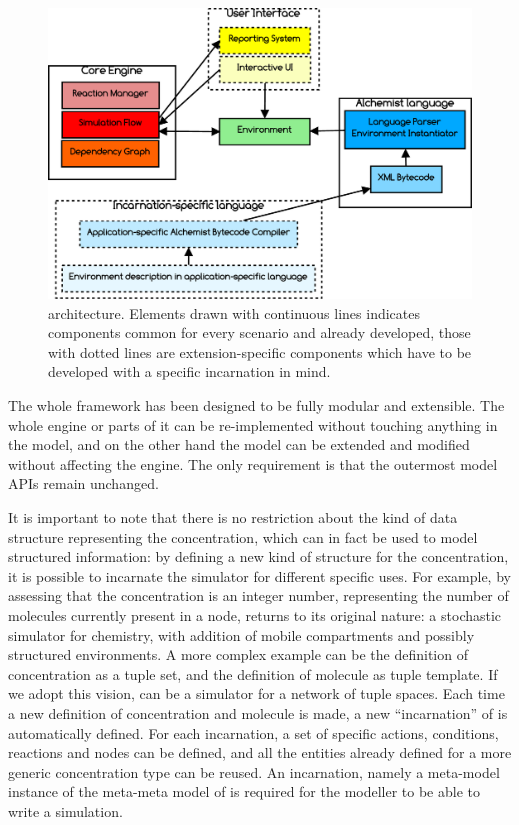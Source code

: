\documentclass[12pt,a4paper,twoside,openright]{book}
\begin{document}
\label{subsec:architecture}
\begin{figure}%
  \begin{center}
    \includegraphics[width=0.7\columnwidth]{img/structure.pdf}
    \caption[\alchemist{} architecture]{\alchemist{} architecture. Elements drawn with continuous lines indicates components common for every scenario and already developed, those with dotted lines are extension-specific components which have to be developed with a specific incarnation in mind.}
    \label{img:arch}
  \end{center}
\end{figure}

The whole framework has been designed to be fully modular and extensible.
%
The whole engine or parts of it can be re-implemented without touching anything in the model, and on the other hand the model can be extended and modified without affecting the engine.
%
The only requirement is that the outermost model APIs remain unchanged.

It is important to note that there is no restriction about the kind of data structure representing the concentration, which can in fact be used to model structured information: by defining a new kind of structure for the concentration, it is possible to incarnate the simulator for different specific uses.
%
For example, by assessing that the concentration is an integer number, representing the number of molecules currently present in a node, \alchemist{} returns to its original nature: a stochastic simulator for chemistry, with addition of mobile compartments and possibly structured environments.
%
A more complex example can be the definition of concentration as a tuple set, and the definition of molecule as tuple template.
%
If we adopt this vision, \alchemist{} can be a simulator for a network of tuple spaces.
%
Each time a new definition of concentration and molecule is made, a new ``incarnation'' of \alchemist{} is automatically defined. For each incarnation, a set of specific actions, conditions, reactions and nodes can be defined, and all the entities already defined for a more generic concentration type can be reused.
%
An incarnation, namely a meta-model instance of the meta-meta model of \alchemist{} is required for the modeller to be able to write a simulation.
\end{document}
